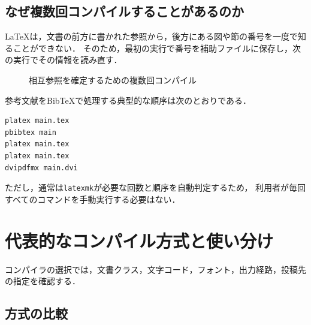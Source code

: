 \documentclass[a4paper,11pt]{jsarticle}
\newcommand{\code}[1]{\texttt{#1}}
\begin{document}
\subsection{なぜ複数回コンパイルすることがあるのか}

LaTeXは，文書の前方に書かれた参照から，後方にある図や節の番号を一度で知ることができない．
そのため，最初の実行で番号を補助ファイルに保存し，次の実行でその情報を読み直す．

\begin{figure}[H]
  \centering
  \caption{相互参照を確定するための複数回コンパイル}
\end{figure}

参考文献をBibTeXで処理する典型的な順序は次のとおりである．

\begin{lstlisting}
platex main.tex
pbibtex main
platex main.tex
platex main.tex
dvipdfmx main.dvi
\end{lstlisting}

ただし，通常は\code{latexmk}が必要な回数と順序を自動判定するため，
利用者が毎回すべてのコマンドを手動実行する必要はない\cite{latex2e-crossrefs,latexmk}．

\clearpage
\section{代表的なコンパイル方式と使い分け}

コンパイラの選択では，文書クラス，文字コード，フォント，出力経路，投稿先の指定を確認する\cite{overleaf-compiler,latex-project-engines}．

\subsection{方式の比較}
\end{document}
